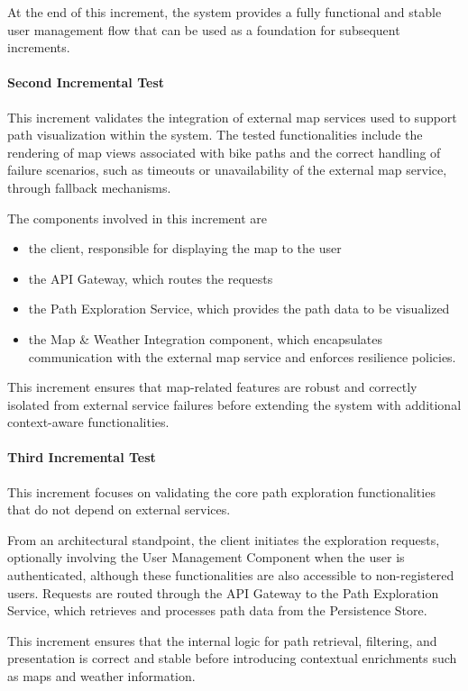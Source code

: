 At the end of this increment, the system provides a fully functional and stable user management flow that can be used as a foundation for subsequent increments.

\paragraph{Second Incremental Test}
This increment validates the integration of external map services used to support path visualization within the system. The tested functionalities include the rendering of map views associated with bike paths and the correct handling of failure scenarios, such as timeouts or unavailability of the external map service, through fallback mechanisms.

The components involved in this increment are
\begin{itemize}
    \item the client, responsible for displaying the map to the user
    \item the API Gateway, which routes the requests
    \item the Path Exploration Service, which provides the path data to be visualized
    \item the Map \& Weather Integration component, which encapsulates communication with the external map service and enforces resilience policies.
\end{itemize}

This increment ensures that map-related features are robust and correctly isolated from external service failures before extending the system with additional context-aware functionalities.

\paragraph{Third Incremental Test}
This increment focuses on validating the core path exploration functionalities that do not depend on external services.

From an architectural standpoint, the client initiates the exploration requests, optionally involving the User Management Component when the user is authenticated, although these functionalities are also accessible to non-registered users. Requests are routed through the API Gateway to the Path Exploration Service, which retrieves and processes path data from the Persistence Store.

This increment ensures that the internal logic for path retrieval, filtering, and presentation is correct and stable before introducing contextual enrichments such as maps and weather information.


